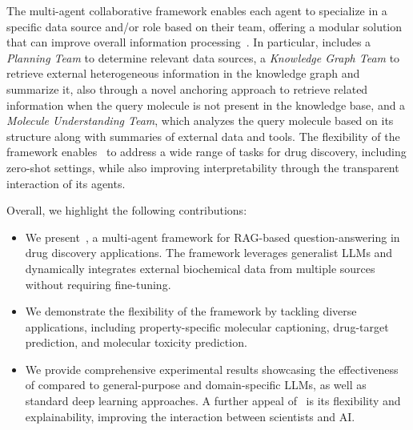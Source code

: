 The multi-agent collaborative framework enables each agent to specialize in a specific data source and/or role based on their team, offering a modular solution that can improve overall information processing~\cite{chan2024chateval}. 
In particular, \proposed includes a \emph{Planning Team} to determine relevant data sources, 
a \emph{Knowledge Graph Team} to retrieve  external heterogeneous information in the knowledge graph and summarize it, also through a novel anchoring approach to retrieve related information when the query molecule is not present in the knowledge base, 
and a \emph{Molecule Understanding Team}, which analyzes the query molecule based on its structure along with summaries of external data and tools.
The flexibility of the framework enables \proposed~to address a wide range of tasks for drug discovery, including zero-shot settings, while also improving interpretability through the transparent interaction of its agents.


Overall, we highlight the following contributions:
\begin{itemize}[leftmargin=.1in]
    \item We present~\proposed, a multi-agent framework for RAG-based question-answering in drug discovery applications. The framework leverages generalist LLMs and dynamically integrates external biochemical data from multiple sources without requiring fine-tuning.
    \item We demonstrate the flexibility of the framework by tackling diverse applications, including property-specific molecular captioning, drug-target prediction, and molecular toxicity prediction. %
    \item We provide comprehensive experimental results showcasing the effectiveness of \proposed compared to general-purpose and domain-specific LLMs, as well as standard deep learning approaches. A further appeal of \proposed~is its flexibility and explainability, improving the interaction between scientists and AI.
\end{itemize}

